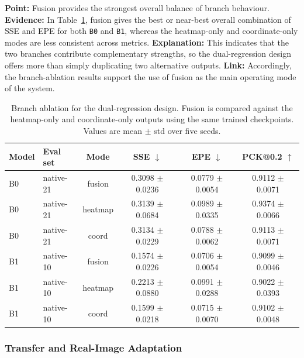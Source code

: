 \documentclass[10pt,letterpaper]{article}
\begin{document}
\medskip
\noindent\textbf{Point:} Fusion provides the strongest overall balance of branch behaviour.  
\textbf{Evidence:} In Table~\ref{tab:branch_ablation}, fusion gives the best or near-best overall combination of SSE and EPE for both \texttt{B0} and \texttt{B1}, whereas the heatmap-only and coordinate-only modes are less consistent across metrics.  
\textbf{Explanation:} This indicates that the two branches contribute complementary strengths, so the dual-regression design offers more than simply duplicating two alternative outputs.  
\textbf{Link:} Accordingly, the branch-ablation results support the use of fusion as the main operating mode of the system.

\begin{table}[t]
\centering
\footnotesize
\caption{Branch ablation for the dual-regression design. Fusion is compared against the heatmap-only and coordinate-only outputs using the same trained checkpoints. Values are mean $\pm$ std over five seeds.}
\label{tab:branch_ablation}
\begin{tabular}{llcccc}
\toprule
Model & Eval set & Mode & SSE $\downarrow$ & EPE $\downarrow$ & PCK@0.2 $\uparrow$ \\
\midrule
B0 & native-21 & fusion & 0.3098 $\pm$ 0.0236 & 0.0779 $\pm$ 0.0054 & 0.9112 $\pm$ 0.0071 \\
B0 & native-21 & heatmap & 0.3139 $\pm$ 0.0684 & 0.0989 $\pm$ 0.0335 & 0.9374 $\pm$ 0.0066 \\
B0 & native-21 & coord & 0.3134 $\pm$ 0.0229 & 0.0788 $\pm$ 0.0062 & 0.9113 $\pm$ 0.0071 \\
B1 & native-10 & fusion & 0.1574 $\pm$ 0.0226 & 0.0706 $\pm$ 0.0054 & 0.9099 $\pm$ 0.0046 \\
B1 & native-10 & heatmap & 0.2213 $\pm$ 0.0880 & 0.0991 $\pm$ 0.0288 & 0.9022 $\pm$ 0.0393 \\
B1 & native-10 & coord & 0.1599 $\pm$ 0.0218 & 0.0715 $\pm$ 0.0070 & 0.9102 $\pm$ 0.0048 \\
\bottomrule
\end{tabular}
\end{table}

\subsubsection{Transfer and Real-Image Adaptation}
\end{document}
